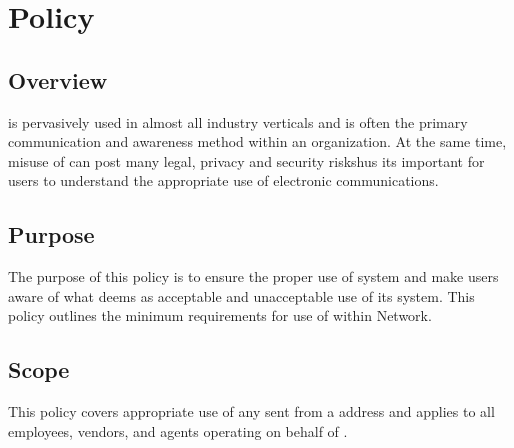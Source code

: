 \chapter{\Email{} Policy}
\CommonIntroduction
\section{Overview}
 is pervasively used in almost all industry verticals and is often the primary communication and awareness method within an organization.  
At the same time, misuse of \email{} can post many legal, privacy\oxford{} and security riskshus its important for users to understand the appropriate use of electronic communications. 
\section{Purpose}
The purpose of this \email{} policy is to ensure the proper use of \CompanyName{} \email{} system and make users aware of what \CompanyName{} deems as acceptable and unacceptable use of its \email{} system.  
This policy outlines the minimum requirements for use of \email{} within \CompanyName{} Network. 
\section{Scope}
This policy covers appropriate use of any \email{} sent from a \CompanyName{} \email{} address and applies to all employees, vendors, and agents operating on behalf of \CompanyName{}.
